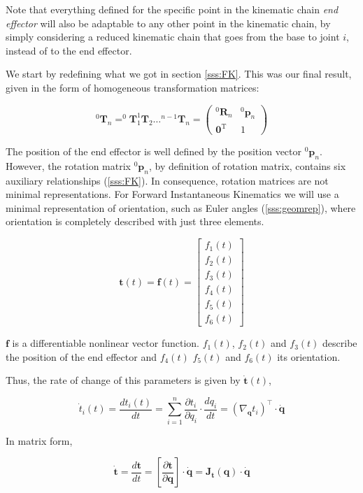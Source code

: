 Note that everything defined for the specific point in the kinematic chain \textit{end effector} will also be adaptable to any other point in the kinematic chain, by simply considering a reduced kinematic chain that goes from the base to joint $i$, instead of to the end effector.

We start by redefining what we got in section \ref{sss:FK}. This was our final result, given in the form of homogeneous transformation matrices:

$$
^{0}\mathbf{T}_{n} = ^{0}\mathbf{T}_{1} ^{1}\mathbf{T}_{2} \dots ^{n-1}\mathbf{T}_{n} =
\left(\begin{array}{cc}
    ^{0} \mathbf{R}_{n} & ^{0} \boldsymbol{p}_{n} \\
    \mathbf{0}^{\mathrm{T}} & 1
\end{array}\right)
$$

The position of the end effector is well defined by the position vector $^{0} \boldsymbol{p}_{n}$. However, the rotation matrix $^{0} \boldsymbol{p}_{n}$, by definition of rotation matrix, contains six auxiliary relationships (\ref{sss:FK}). In consequence, rotation matrices are not minimal representations. For Forward Instantaneous Kinematics we will use a minimal representation of orientation, such as Euler angles (\ref{sss:geomrep}), where orientation is completely described with just three elements.

$$\mathbf{t}(t) = \mathbf{f}(t) = \begin{bmatrix} f_{1}(t) \\ f_{2}(t) \\ f_{3}(t) \\ f_{4}(t) \\ f_{5}(t) \\ f_{6}(t) \end{bmatrix}
$$

$\mathbf{f}$ is a differentiable nonlinear vector function. $f_{1}(t)$, $f_{2}(t)$ and $f_{3}(t)$ describe the position of the end effector and $f_{4}(t)$ $f_{5}(t)$ and $f_{6}(t)$ its orientation.

Thus, the rate of change of this parameters is given by $\mathbf{\dot{t}}(t)$,

$$
\label{asdf}
{\dot{t}_i}(t) = \frac{d{{t}_i}(t)}{dt} = \sum_{i=1}^{n} \frac{\partial{{t}_i}}{\partial q_i} \cdot \frac{dq_i}{dt} = (\nabla_{\mathbf{q}}{t}_i)^{\intercal} \cdot \mathbf{\dot{q}}
$$

In matrix form,

$$
\mathbf{\dot{t}} = \frac{d\mathbf{{t}}}{dt} =
[
    \frac{\partial{\mathbf{t}}}{\partial \mathbf{q}}
]
\cdot \mathbf{\dot{q}} =
\mathbf{J}_{\mathbf{t}}(\mathbf{{q}}) \cdot \mathbf{\dot{q}}
$$

